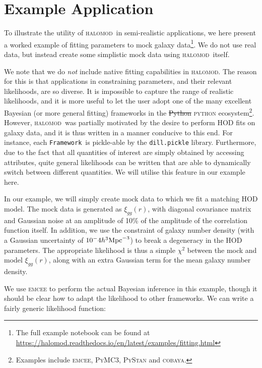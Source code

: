 \documentclass[5p,aas_macros]{elsarticle}
\newcommand{\halomod}{\textsc{halomod}\xspace} %
\newcommand{\python}{\textsc{python}\xspace} %
\newcommand{\framework}{\texttt{Framework}\xspace} %
\providecommand{\DIFaddtex}[1]{{\protect\color{blue}\uwave{#1}}} %
\providecommand{\DIFdeltex}[1]{{\protect\color{red}\sout{#1}}}                      %
\providecommand{\DIFaddbegin}{} %
\providecommand{\DIFaddend}{} %
\providecommand{\DIFdelbegin}{} %
\providecommand{\DIFdelend}{} %
\providecommand{\DIFadd}[1]{\texorpdfstring{\DIFaddtex{#1}}{#1}} %
\providecommand{\DIFdel}[1]{\texorpdfstring{\DIFdeltex{#1}}{}} %
\begin{document}
\section{Example Application}
\label{sec:applications}

To illustrate the utility of \halomod\ in semi-realistic applications, we here present a worked example of fitting parameters to mock galaxy data\footnote{The full example notebook can be found at \url{https://halomod.readthedocs.io/en/latest/examples/fitting.html}}. 
We do not use real data, but instead create some simplistic mock data using \halomod\ itself.

We note that we do \textit{not} include native fitting capabilities in \halomod. The reason for this is that applications in constraining parameters, and their relevant likelihoods, are so diverse. It is impossible to capture the range of realistic likelihoods, and it is more useful to let the user adopt one of the many excellent Bayesian (or more general fitting) frameworks in the \DIFdelbegin \DIFdel{Python }\DIFdelend \DIFaddbegin \python \DIFaddend ecosystem\footnote{Examples include \textsc{emcee}, \textsc{PyMC3}, \textsc{PyStan} and \textsc{cobaya}.}.
However, \halomod\ was partially motivated by the desire to perform HOD fits on galaxy data, and it is thus written in a manner conducive to this end.
For instance, each \framework\ is pickle-able by the \verb|dill.pickle| library. 
Furthermore, due to the fact that all quantities of interest are simply obtained by accessing attributes, quite general likelihoods can be written that are able to dynamically switch between different quantities. We will utilise this feature in our example here.

In our example, we will simply create mock data to which we fit a matching HOD model. 
The mock data is generated as \DIFdelbegin \DIFdel{$\xi_{gg}(r)$}\DIFdelend \DIFaddbegin \DIFadd{$\xi_{\rm gg}(r)$}\DIFaddend , with diagonal covariance matrix and Gaussian noise at an amplitude of 10\% of the amplitude of the correlation function itself. In addition, we use the constraint of galaxy number density (with a Gaussian uncertainty of $10^-4 h^3{\rm Mpc}^{-3}$) to break a degeneracy in the HOD parameters.
The appropriate likelihood is thus a simple $\chi^2$ between the mock and model \DIFdelbegin \DIFdel{$\xi_{gg}(r)$}\DIFdelend \DIFaddbegin \DIFadd{$\xi_{\rm gg}(r)$}\DIFaddend , along with an extra Gaussian term for the mean galaxy number density.

We use \textsc{emcee} to perform the actual Bayesian inference in this example, though it should be clear how to adapt the likelihood to other frameworks. We can write a fairly generic likelihood function:
\end{document}
